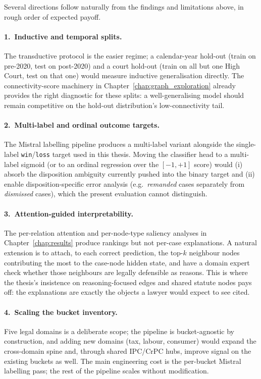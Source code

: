 Several directions follow naturally from the findings and limitations
above, in rough order of expected payoff.

\paragraph{1.\ Inductive and temporal splits.} The transductive
protocol is the easier regime; a calendar-year hold-out (train on
pre-2020, test on post-2020) and a court hold-out (train on all but
one High Court, test on that one) would measure inductive
generalisation directly. The connectivity-score machinery in
Chapter~\ref{chap:graph_exploration} already provides the right
diagnostic for these splits: a well-generalising model should remain
competitive on the hold-out distribution's low-connectivity tail.

\paragraph{2.\ Multi-label and ordinal outcome targets.} The Mistral
labelling pipeline produces a multi-label variant alongside the
single-label \texttt{win}/\texttt{loss} target used in this thesis.
Moving the classifier head to a multi-label sigmoid (or to an ordinal
regression over the $[-1,+1]$ score) would (i) absorb the
disposition ambiguity currently pushed into the binary target and
(ii) enable disposition-specific error analysis (e.g.\ \emph{remanded}
cases separately from \emph{dismissed} cases), which the present
evaluation cannot distinguish.

\paragraph{3.\ Attention-guided interpretability.} The per-relation
attention and per-node-type saliency analyses in
Chapter~\ref{chap:results} produce rankings but not per-case
explanations. A natural extension is to attach, to each correct
prediction, the top-$k$ neighbour nodes contributing the most to the
case-node hidden state, and have a domain expert check whether those
neighbours are legally defensible as reasons. This is where the
thesis's insistence on reasoning-focused edges and shared statute
nodes pays off: the explanations are exactly the objects a lawyer
would expect to see cited.

\paragraph{4.\ Scaling the bucket inventory.} Five legal domains is
a deliberate scope; the pipeline is bucket-agnostic by construction,
and adding new domains (tax, labour, consumer) would expand the
cross-domain spine and, through shared IPC/CrPC hubs, improve signal
on the existing buckets as well. The main engineering cost is the
per-bucket Mistral labelling pass; the rest of the pipeline scales
without modification.

